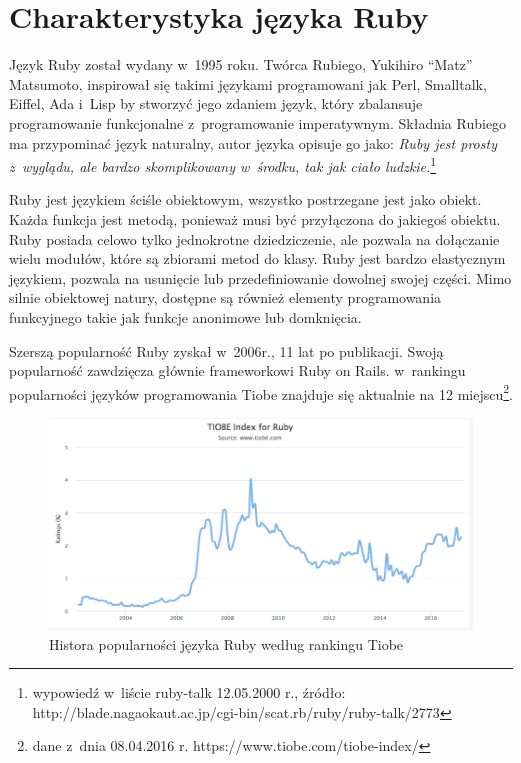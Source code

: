 \documentclass[printmode]{mgr}
\begin{document}
\section{Charakterystyka języka Ruby}
Język Ruby został wydany w~1995 roku. Twórca Rubiego, Yukihiro “Matz” Matsumoto, inspirował się takimi językami programowani jak Perl, Smalltalk, Eiffel, Ada i~Lisp by stworzyć jego zdaniem język, który zbalansuje programowanie funkcjonalne z~programowanie imperatywnym\cite{doc_ruby}. Składnia Rubiego ma przypominać język naturalny, autor języka opisuje go jako: \emph{Ruby jest prosty z~wyglądu, ale bardzo skomplikowany w~środku, tak jak ciało ludzkie.}\footnote{wypowiedź w~liście ruby-talk 12.05.2000 r., źródło: http://blade.nagaokaut.ac.jp/cgi-bin/scat.rb/ruby/ruby-talk/2773}

Ruby jest językiem ściśle obiektowym, wszystko postrzegane jest jako obiekt. Każda funkcja jest metodą, ponieważ musi być przyłączona do jakiegoś obiektu. Ruby posiada celowo tylko jednokrotne dziedziczenie, ale pozwala na dołączanie wielu modułów, które są zbiorami metod do klasy. Ruby jest bardzo elastycznym językiem, pozwala na usunięcie lub przedefiniowanie dowolnej swojej części. Mimo silnie obiektowej natury, dostępne są również elementy programowania funkcyjnego takie jak funkcje anonimowe lub domknięcia.

Szerszą popularność Ruby zyskał w~2006r., 11 lat po publikacji. Swoją popularność zawdzięcza głównie frameworkowi Ruby on Rails. w~rankingu popularności języków programowania Tiobe znajduje się aktualnie na 12 miejscu\footnote{dane z~dnia 08.04.2016 r. https://www.tiobe.com/tiobe-index/}.

\begin{figure}[H]
  \centering
  \includegraphics[width=1\linewidth]{obrazki/ruby_tiobe}
  \caption{Histora popularności języka Ruby według rankingu Tiobe}
  \label{fig:ruby_tiobe}
\end{figure}
\end{document}
